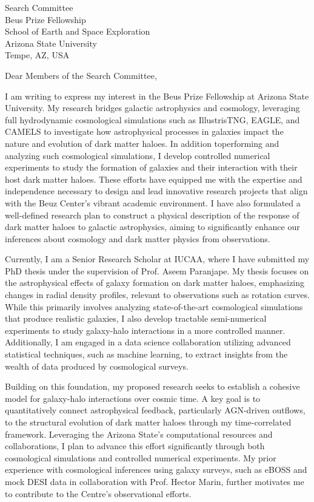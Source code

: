 \documentclass[11pt]{letter}
\begin{document}
\begin{letter}{Search Committee \\ Beus Prize Fellowship \\ School of Earth and Space Exploration \\ Arizona State University \\ Tempe, AZ, USA}

\opening{Dear Members of the Search Committee,}

I am writing to express my interest in the Beus Prize Fellowship at Arizona State University. My research bridges galactic astrophysics and cosmology, leveraging full hydrodynamic cosmological simulations such as IllustrisTNG, EAGLE, and CAMELS to investigate how astrophysical processes in galaxies impact the nature and evolution of dark matter haloes. In addition toperforming and analyzing such cosmological simulations, I develop controlled numerical experiments to study the formation of galaxies and their interaction with their host dark matter haloes. These efforts have equipped me with the expertise and independence necessary to design and lead innovative research projects that align with the Beuz Center's vibrant academic environment. I have also formulated a well-defined research plan to construct a physical description of the response of dark matter haloes to galactic astrophysics, aiming to significantly enhance our inferences about cosmology and dark matter physics from observations.

Currently, I am a Senior Research Scholar at IUCAA, where I have submitted my PhD thesis under the supervision of Prof. Aseem Paranjape. My thesis focuses on the astrophysical effects of galaxy formation on dark matter haloes, emphasizing changes in radial density profiles, relevant to observations such as rotation curves. While this primarily involves analyzing state-of-the-art cosmological simulations that produce realistic galaxies, I also develop tractable semi-numerical experiments to study galaxy-halo interactions in a more controlled manner. Additionally, I am engaged in a data science collaboration utilizing advanced statistical techniques, such as machine learning, to extract insights from the wealth of data produced by cosmological surveys.

Building on this foundation, my proposed research seeks to establish a cohesive model for galaxy-halo interactions over cosmic time. A key goal is to quantitatively connect astrophysical feedback, particularly AGN-driven outflows, to the structural evolution of dark matter haloes through my time-correlated framework. Leveraging the Arizona State's computational resources and collaborations, I plan to advance this effort significantly through both cosmological simulations and controlled numerical experiments. My prior experience with cosmological inferences using galaxy surveys, such as eBOSS and mock DESI data in collaboration with Prof. Hector Marin, further motivates me to contribute to the Centre's observational efforts.


\end{letter}
\end{document}
